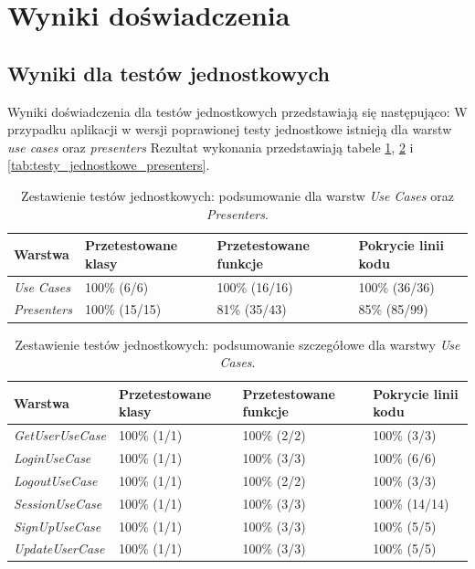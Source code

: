\section{Wyniki doświadczenia}
\label{wyniki_doswiadczenia}
\subsection{Wyniki dla testów jednostkowych}
Wyniki doświadczenia dla testów jednostkowych przedstawiają się następująco:
W przypadku aplikacji w wersji poprawionej testy jednostkowe istnieją dla warstw \textit{use cases} oraz \textit{presenters} Rezultat wykonania przedstawiają tabele \ref{tab:testy_jednostkowe_razem}, \ref{tab:testy_jednostkowe_usecases} i \ref{tab:testy_jednostkowe_presenters}.
\begin{table}[!htb]
\centering
\caption{Zestawienie testów jednostkowych: podsumowanie dla warstw \textit{Use Cases} oraz \textit{Presenters}.}
\label{tab:testy_jednostkowe_razem}
\begin{tabular}{|l|l|l|l|}
\hline
\textbf{Warstwa} & \textbf{Przetestowane klasy} & \textbf{Przetestowane funkcje} & \textbf{Pokrycie linii kodu} \\ \hline
\textit{Use Cases} & 100\% (6/6) & 100\% (16/16) & 100\% (36/36)	\\ \hline
\textit{Presenters} & 100\% (15/15)	& 81\% (35/43) & 85\% (85/99) \\ \hline
\end{tabular}
\end{table}

\begin{table}[!htb]
\centering
\caption{Zestawienie testów jednostkowych: podsumowanie szczegółowe dla warstwy \textit{Use Cases}.}
\label{tab:testy_jednostkowe_usecases}
\begin{tabular}{|l|l|l|l|}
\hline
\textbf{Warstwa} & \textbf{Przetestowane klasy} & \textbf{Przetestowane funkcje} & \textbf{Pokrycie linii kodu} \\ \hline
\textit{GetUserUseCase} & 100\% (1/1) & 100\% (2/2) & 100\% (3/3)	\\ \hline
\textit{LoginUseCase} & 100\% (1/1) & 100\% (3/3) & 100\% (6/6)	\\ \hline
\textit{LogoutUseCase} & 100\% (1/1) & 100\% (2/2) & 100\% (3/3)	\\ \hline
\textit{SessionUseCase} & 100\% (1/1) & 100\% (3/3) & 100\% (14/14)	\\ \hline
\textit{SignUpUseCase} & 100\% (1/1) & 100\% (3/3) & 100\% (5/5)	\\ \hline
\textit{UpdateUserCase} & 100\% (1/1) & 100\% (3/3) & 100\% (5/5)	\\ \hline
\end{tabular}
\end{table}

